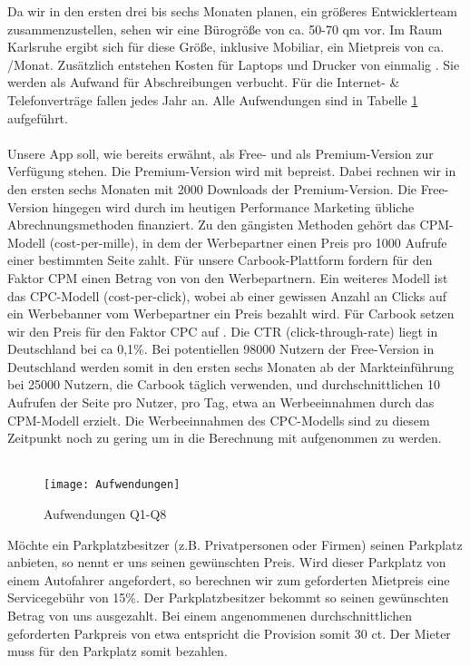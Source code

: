 \documentclass[12pt,ngerman, fleqn]{book} %
\begin{document}
Da wir in den ersten drei bis sechs Monaten planen, ein größeres Entwicklerteam zusammenzustellen, sehen wir eine Bürogröße von ca. 50-70 qm vor. Im Raum Karlsruhe ergibt sich für diese Größe, inklusive Mobiliar, ein Mietpreis von ca. /Monat. Zusätzlich entstehen Kosten für Laptops und Drucker von einmalig . Sie werden als Aufwand für Abschreibungen verbucht. Für die Internet- & Telefonverträge fallen jedes Jahr  an. Alle Aufwendungen sind in Tabelle \ref{fig:Aufwendungen} aufgeführt.\\ \\
Unsere App soll, wie bereits erwähnt, als Free- und als Premium-Version zur Verfügung stehen. Die Premium-Version wird mit  bepreist. Dabei rechnen wir in den ersten sechs Monaten mit 2000 Downloads der Premium-Version. 
Die Free-Version hingegen wird durch im heutigen Performance Marketing übliche Abrechnungsmethoden finanziert\autocite{abrechnungsmodelle}. Zu den gängisten Methoden gehört das CPM-Modell (cost-per-mille), in dem der Werbepartner einen Preis pro 1000 Aufrufe einer bestimmten Seite zahlt\autocite{adsense,mobilgeld}. Für unsere Carbook-Plattform fordern für den Faktor CPM einen Betrag von  von den Werbepartnern. Ein weiteres Modell ist das CPC-Modell (cost-per-click), wobei ab einer gewissen Anzahl an Clicks auf ein Werbebanner vom Werbepartner ein Preis bezahlt wird. Für Carbook setzen wir den Preis für den Faktor CPC auf . Die CTR (click-through-rate) liegt in Deutschland bei ca 0,1\%\autocite{ctr}. Bei potentiellen 98000 Nutzern der Free-Version in Deutschland werden somit in den ersten sechs Monaten ab der Markteinführung bei 25000 Nutzern, die Carbook täglich verwenden, und durchschnittlichen 10 Aufrufen der Seite pro Nutzer, pro Tag, etwa  an Werbeeinnahmen durch das CPM-Modell erzielt. Die Werbeeinnahmen des CPC-Modells sind zu diesem Zeitpunkt noch zu gering um in die Berechnung mit aufgenommen zu werden.\\ \\
\begin{figure}
    \centering
    \texttt{[image: Aufwendungen]}
    \caption{Aufwendungen Q1-Q8}
    \label{fig:Aufwendungen}
\end{figure}
Möchte ein Parkplatzbesitzer (z.B. Privatpersonen oder Firmen) seinen Parkplatz anbieten, so nennt er uns seinen gewünschten Preis. Wird dieser Parkplatz von einem Autofahrer angefordert, so berechnen wir zum geforderten Mietpreis eine Servicegebühr von 15\%. Der Parkplatzbesitzer bekommt so seinen gewünschten Betrag von uns ausgezahlt. Bei einem angenommenen durchschnittlichen geforderten Parkpreis von etwa  entspricht die Provision somit 30 ct. Der Mieter muss für den Parkplatz somit  bezahlen.\\ \\
\end{document}
